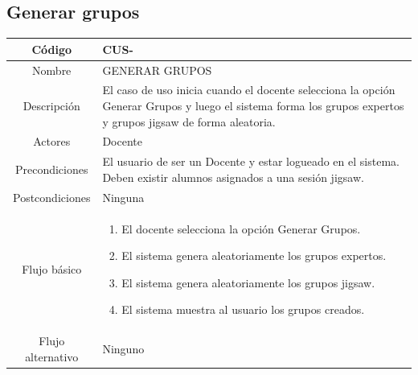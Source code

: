 \subsection{Generar grupos}
\begin{longtable}{|c|L{10cm}|}
	\toprule[0.8mm]
	Código &  CUS-\casodeuso\\  \midrule
	Nombre &  GENERAR GRUPOS\\  \midrule
	Descripción &  El caso de uso inicia cuando el docente selecciona la opción Generar Grupos y luego el sistema forma los grupos expertos y grupos jigsaw de forma aleatoria.\\  \midrule
	Actores &  Docente\\  \midrule
	Precondiciones &  El usuario de ser un Docente y estar logueado en el sistema. Deben existir alumnos asignados a una sesión jigsaw.\\  \midrule
	Postcondiciones &  Ninguna\\  \midrule
	Flujo básico &    \begin{enumerate}
		\item El docente selecciona la opción Generar Grupos.
		\item El sistema genera aleatoriamente los grupos expertos.
		\item El sistema genera aleatoriamente los grupos jigsaw.
		\item El sistema muestra al usuario los grupos creados.
	\end{enumerate}  \\ \midrule
	Flujo alternativo & Ninguno \\  \bottomrule[0.8mm]
\end{longtable}
\clearpage
